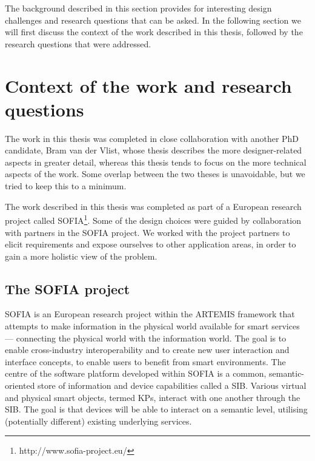 The background described in this section provides for interesting design challenges and research questions that can be asked. In the following section we will first discuss the context of the work described in this thesis, followed by the research questions that were addressed.







\section{Context of the work and research questions}

The work in this thesis was completed in close collaboration with another PhD candidate, Bram van der Vlist, whose thesis \cite{Bram} describes the more designer-related aspects in greater detail, whereas this thesis tends to focus on the more technical aspects of the work. Some overlap between the two theses is unavoidable, but we tried to keep this to a minimum. 

The work described in this thesis was completed as part of a European research project called \ac{SOFIA}\footnote{http://www.sofia-project.eu/}. Some of the design choices were guided by collaboration with partners in the \ac{SOFIA} project. We worked with the project partners to elicit requirements and expose ourselves to other application areas, in order to gain a more holistic view of the problem.


\subsection{The SOFIA project}\label{sofia}

\ac{SOFIA} is an European research project within the ARTEMIS framework that attempts to make information in the physical world available for smart services --- connecting the physical world with the information world. The goal is to enable cross-industry interoperability and to create new user interaction and interface concepts, to enable users to benefit from smart environments. The centre of the software platform developed within \ac{SOFIA} is a common, semantic-oriented store of information and device capabilities called a \ac{SIB}. Various virtual and physical smart objects, termed \acp{KP}, interact with one another through the \ac{SIB}. The goal is that devices will be able to interact on a semantic level, utilising (potentially different) existing underlying services.

